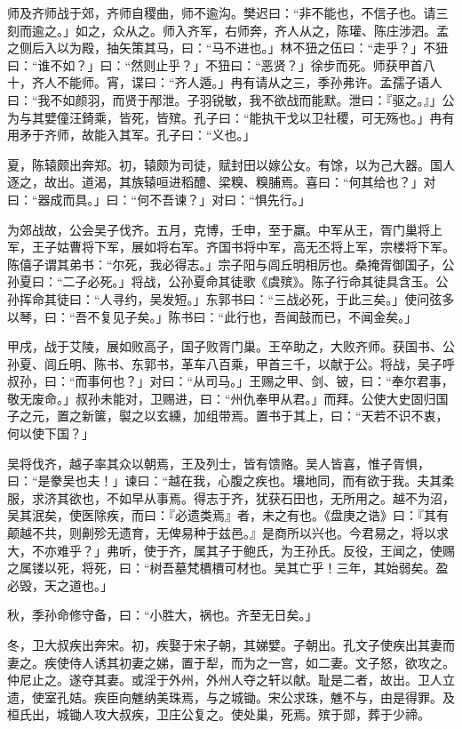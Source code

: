 \documentclass[]{article}
\begin{document}
师及齐师战于郊，齐师自稷曲，师不逾沟。樊迟曰：``非不能也，不信子也。请三刻而逾之。」如之，众从之。师入齐军，右师奔，齐人从之，陈瓘、陈庄涉泗。孟之侧后入以为殿，抽矢策其马，曰：``马不进也。」林不狃之伍曰：``走乎？」不狃曰：``谁不如？」曰：``然则止乎？」不狃曰：``恶贤？」徐步而死。师获甲首八十，齐人不能师。宵，谍曰：``齐人遁。」冉有请从之三，季孙弗许。孟孺子语人曰：``我不如颜羽，而贤于邴泄。子羽锐敏，我不欲战而能默。泄曰：『驱之。』」公为与其嬖僮汪錡乘，皆死，皆殡。孔子曰：``能执干戈以卫社稷，可无殇也。」冉有用矛于齐师，故能入其军。孔子曰：``义也。」

夏，陈辕颇出奔郑。初，辕颇为司徒，赋封田以嫁公女。有馀，以为己大器。国人逐之，故出。道渴，其族辕咺进稻醴、梁糗、糗脯焉。喜曰：``何其给也？」对曰：``器成而具。」曰：``何不吾谏？」对曰：``惧先行。」

为郊战故，公会吴子伐齐。五月，克博，壬申，至于羸。中军从王，胥门巢将上军，王子姑曹将下军，展如将右军。齐国书将中军，高无丕将上军，宗楼将下军。陈僖子谓其弟书：``尔死，我必得志。」宗子阳与闾丘明相厉也。桑掩胥御国子，公孙夏曰：``二子必死。」将战，公孙夏命其徒歌《虞殡》。陈子行命其徒具含玉。公孙挥命其徒曰：``人寻约，吴发短。」东郭书曰：``三战必死，于此三矣。」使问弦多以琴，曰：``吾不复见子矣。」陈书曰：``此行也，吾闻鼓而已，不闻金矣。」

甲戌，战于艾陵，展如败高子，国子败胥门巢。王卒助之，大败齐师。获国书、公孙夏、闾丘明、陈书、东郭书，革车八百乘，甲首三千，以献于公。将战，吴子呼叔孙，曰：``而事何也？」对曰：``从司马。」王赐之甲、剑、铍，曰：``奉尔君事，敬无废命。」叔孙未能对，卫赐进，曰：``州仇奉甲从君。」而拜。公使大史固归国子之元，置之新箧，褽之以玄纁，加组带焉。置书于其上，曰：``天若不识不衷，何以使下国？」

吴将伐齐，越子率其众以朝焉，王及列士，皆有馈赂。吴人皆喜，惟子胥惧，曰：``是豢吴也夫！」谏曰：``越在我，心腹之疾也。壤地同，而有欲于我。夫其柔服，求济其欲也，不如早从事焉。得志于齐，犹获石田也，无所用之。越不为沼，吴其泯矣，使医除疾，而曰：『必遗类焉』者，未之有也。《盘庚之诰》曰：『其有颠越不共，则劓殄无遗育，无俾易种于兹邑。』是商所以兴也。今君易之，将以求大，不亦难乎？」弗听，使于齐，属其子于鲍氏，为王孙氏。反役，王闻之，使赐之属镂以死，将死，曰：``树吾墓梵檟檟可材也。吴其亡乎！三年，其始弱矣。盈必毁，天之道也。」

秋，季孙命修守备，曰：``小胜大，祸也。齐至无日矣。」

冬，卫大叔疾出奔宋。初，疾娶于宋子朝，其娣嬖。子朝出。孔文子使疾出其妻而妻之。疾使侍人诱其初妻之娣，置于犁，而为之一宫，如二妻。文子怒，欲攻之。仲尼止之。遂夺其妻。或淫于外州，外州人夺之轩以献。耻是二者，故出。卫人立遗，使室孔姞。疾臣向魋纳美珠焉，与之城锄。宋公求珠，魋不与，由是得罪。及桓氏出，城锄人攻大叔疾，卫庄公复之。使处巢，死焉。殡于郧，葬于少禘。
\end{document}
